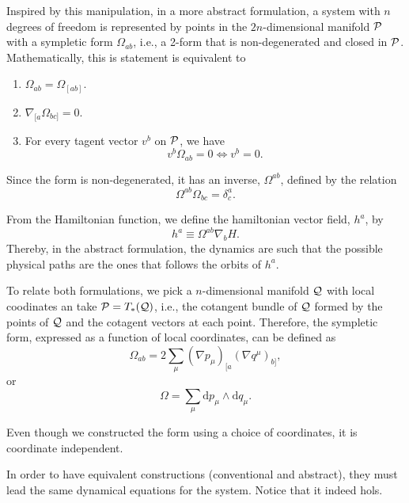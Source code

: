 Inspired by this manipulation, in a more abstract formulation, a system with \(n\) degrees of freedom is represented by points in the \(2n\)-dimensional manifold \({\mathcal{P}}\) with a sympletic form \(\Omega_{ab}\), i.e., a 2-form that is non-degenerated and closed in \({\mathcal{P}}\). Mathematically, this is statement is equivalent to
\begin{enumerate}
    \item \(\Omega_{ab}=\Omega_{[ab]}\).
    \item \(\nabla_{[a}\Omega_{bc]}=0\).
    \item For every tagent vector \(v^b\) on \({\mathcal{P}}\), we have
    \begin{equation}
        v^b\Omega_{ab}=0\iff v^b=0.
    \end{equation}
\end{enumerate}

Since the form is non-degenerated, it has an inverse, \(\Omega^{ab}\), defined by the relation
\begin{equation}
    \Omega^{ab}\Omega_{bc}=\delta^a_c.
\end{equation}

From the Hamiltonian function, we define the hamiltonian vector field, \(h^a\), by
\begin{equation}
    h^a\equiv\Omega^{ab}\nabla_bH.
\end{equation}
Thereby, in the abstract formulation, the dynamics are such that the possible physical paths are the ones that follows the orbits of \(h^a\).

To relate both formulations, we pick a \(n\)-dimensional manifold \({\mathcal{Q}}\) with local coodinates an take \({\mathcal{P}}=T_*({\mathcal{Q}})\), i.e., the cotangent bundle of \({\mathcal{Q}}\) formed by the points of \({\mathcal{Q}}\) and the cotagent vectors at each point. Therefore, the sympletic form, expressed as a function of local coordinates, can be defined as 
\begin{equation}
    \Omega_{ab}=2\sum_{\mu}\left(\nabla p_{\mu}\right)_{[a}\left(\nabla q^{\mu}\right)_{b]},
    \label{eq:omegapq}
\end{equation}
or
\begin{equation}
    \Omega=\sum_{\mu}\mathrm{d}p_{\mu}\wedge\mathrm{d}q_{\mu}.
\end{equation}

Even though we constructed the form using a choice of coordinates, it is coordinate independent.

In order to have equivalent constructions (conventional and abstract), they must lead the same dynamical equations for the system. Notice that it indeed hols.

